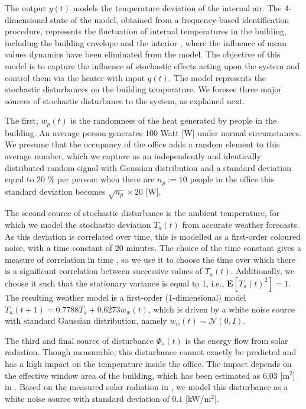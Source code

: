 \documentclass[letterpaper, 10 pt, conference]{amsart}
\theoremstyle{definition}
\theoremstyle{example}
\theoremstyle{remark}
\begin{document}
The output $y(t)$ models the temperature deviation of the internal air.
The 4-dimensional state of the model, obtained from a frequency-based identification procedure, 
represents the fluctuation of internal temperatures in the building, 
including the building envelope and the interior
\cite[TiTeThTs model]{Bacher2011}, 
where the influence of mean values dynamics have been eliminated from the model. 
The objective of this model is to capture the influence of stochastic effects acting upon the system and control them via the heater with input $q(t)$.
The model represents the stochastic disturbances on the building temperature.  
We foresee three major sources of stochastic disturbance to the system, as explained next. 

The first, $w_p(t)$ is the randomness of the heat generated by people in the building. 
An average person generates $100$ Watt [W] under normal circumstances. 
We presume that the occupancy of the office adds a random element to this average number, 
which we capture as an independently and identically distributed random signal with Gaussian distribution and a standard deviation equal to 20 $\%$ per person:  
when there are $n_p:=10$ people in the office this standard deviation becomes $\sqrt{n_p}\times 20$ [W].
 
The second source of stochastic disturbance is the ambient temperature, 
for which we model the stochastic deviation $T_a(t)$ from accurate weather forecasts. 
As this deviation is correlated over time, this is modelled as a first-order coloured noise,  
with a time constant of 20 minutes. 
The choice of the time constant gives a measure of correlation in time \cite{therrien1992discrete}, 
so we use it to choose the time over which there is a significant correlation between successive values of $T_a(t)$. 
Additionally, we choose it such that the stationary variance is equal to 1, i.e., $\mathbf E \left[T_a(t)^2  \right]=1 $. 
The resulting weather model is a first-order (1-dimensional) model \(T_a(t+1)=0.7788 T_a+0.6273 w_{w}(t)\), 
which is driven by a white noise source with standard Gaussian distribution, namely $w_w(t)\sim\mathcal N(0,I)$.  

The third and final source of disturbance $\Phi_s(t)$ is the energy flow from solar radiation. 
Though measurable, this disturbance cannot exactly be predicted and has a high impact on the temperature inside the office. 
The impact depends on the effective window area of the building, which has been estimated as 6.03 [m$^2$] in \cite{Bacher2011}. 
Based on the measured solar radiation in \cite{Bacher2011}, we model this disturbance as a white noise source with standard deviation of $0.1$ [kW/m$^2$]. 
\end{document}

